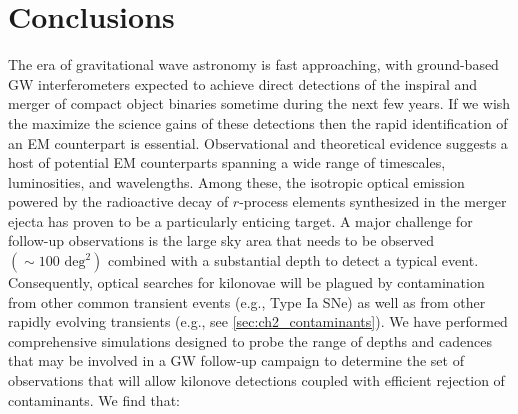 \section{Conclusions}
\label{sec:ch2_conc}
The era of gravitational wave astronomy is fast approaching, with ground-based GW interferometers expected to achieve direct detections of the inspiral and merger of compact object binaries sometime during the next few years. If we wish the maximize the science gains of these detections then the rapid identification of an EM counterpart is essential.  Observational and theoretical evidence suggests a host of potential EM counterparts spanning a wide range of timescales, luminosities, and wavelengths. Among these, the isotropic optical emission powered by the radioactive decay of $r$-process elements synthesized in the merger ejecta has proven to be a particularly enticing target. A major challenge for follow-up observations is the large sky area that needs to be observed $(\sim100\text{ deg}^2)$ combined with a substantial depth to detect a typical event. Consequently, optical searches for kilonovae will be plagued by contamination from other common transient events (e.g., Type Ia SNe) as well as from other rapidly evolving transients (e.g., see \cref{sec:ch2_contaminants}). We have performed comprehensive simulations designed to probe the range of depths and cadences that may be involved in a GW follow-up campaign to determine the set of observations that will allow kilonove detections coupled with efficient rejection of contaminants. We find that:

